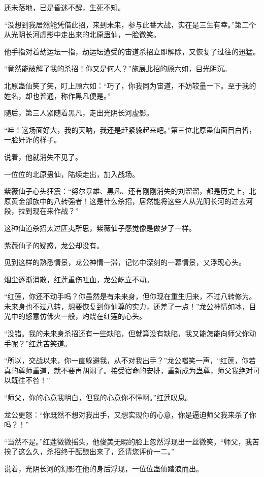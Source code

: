 \begin{this_body}
还未落地，已是昏迷不醒，生死不知。

“没想到我居然能凭借此招，来到未来，参与此番大战，实在是三生有幸。”第二个从光阴长河虚影中走出来的北原蛊仙，一脸微笑。

他手指对着劫运坛一指，劫运坛遭受的宙道杀招立即解除，又恢复了过往的迅猛。

“竟然能破解了我的杀招！你又是何人？”施展此招的顾六如，目光阴沉。

北原蛊仙笑了笑，盯上顾六如：“巧了，你我同为宙道，不妨较量一下。至于我的姓名，却也普通，称作黑凡便是。”

随后，第三人紧随着黑凡，走出光阴长河虚影。

“哇！这场面好大，我的天呐，我还是赶紧躲起来吧。”第三位北原蛊仙面目白皙，一脸奸诈的样子。

说着，他就消失不见了。

一位位的北原蛊仙，陆续走出，加入战场。

紫薇仙子心头狂震：“努尔暴雄、黑凡、还有刚刚消失的刘溜溜，都是历史上，北原黄金部族中的八转强者！这是什么杀招，居然能将这些人从光阴长河的过去河段，拉到现在来作战？”

这种仙道杀招太过匪夷所思，紫薇仙子感觉像是做梦了一样。

紫薇仙子的疑惑，龙公却没有。

见到这样的熟悉情景，龙公神情一滞，记忆中深刻的一幕情景，又浮现心头。

烟尘逐渐消散，红莲重伤吐血，龙公屹立不动。

“红莲，你还不动手吗？你虽然是有未来身，但你现在重生归来，不过八转修为。未来身也不过八转，想要恢复到你仙尊的实力，还差了一点！”龙公神情如冰，目光中的怒意仿佛火一般，灼烧在红莲的心头。

“没错。我的未来身杀招还有一些缺陷，但就算没有缺陷，我又能怎能向师父你动手呢？”红莲苦笑道。

“所以，交战以来，你一直躲避我，从不对我出手？”龙公嗤笑一声，“红莲，你若真的尊师重道，就不要再胡闹了。接受宿命的安排，重新成为蛊尊，师父我绝对可以既往不咎！”

“师父，你的心意我明白，但我的心意你不懂啊。”红莲叹息。

龙公更怒：“你既然不想对我出手，又想实现你的心意，你是逼迫师父我来杀了你吗？！”

“当然不是。”红莲微微摇头，他俊美无暇的脸上忽然浮现出一丝微笑，“师父，我苦挨了这么久，杀招终于酝酿出来了，还请您评价一二。”

说着，光阴长河的幻影在他的身后浮现，一位位蛊仙踏浪而出。


\end{this_body}
